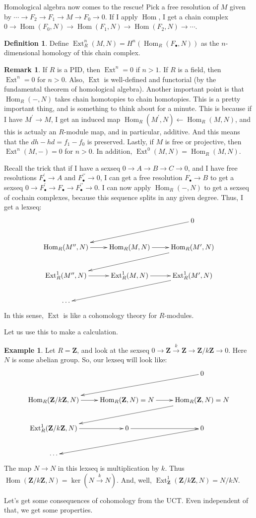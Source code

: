 \documentclass{amsart}
\theoremstyle{theorem}
\theoremstyle{definition}
\newtheorem{definition}[theorem]{Definition}
\newtheorem{remark}[theorem]{Remark}
\newtheorem{example}[theorem]{Example}
\DeclareMathOperator{\Ext}{Ext}
\DeclareMathOperator{\Hom}{Hom}
\newcommand{\Z}{\mathbf Z}
\begin{document}
Homological algebra now comes to the rescue! Pick a free resolution of $M$ given by $\cdots\to F_2\to F_1\to M\to F_0\to 0$. If I apply $\Hom$, I get a chain complex $0\to \Hom(F_0,N)\to \Hom(F_1,N)\to \Hom(F_2,N)\to\cdots$.
\begin{definition}
Define $\Ext_R^n(M,N)= H^n(\Hom_R(F_\bullet,N))$ as the $n$-dimensional homology of this chain complex.
\end{definition}
\begin{remark}
If $R$ is a PID, then $\Ext^n=0$ if $n>1$. If $R$ is a field, then $\Ext^n=0$ for $n>0$. Also, $\Ext$ is well-defined and functorial (by the fundamental theorem of homological algebra). Another important point is that $\Hom_R(-,N)$ takes chain homotopies to chain homotopies. This is a pretty important thing, and is something to think about for a minute. This is because if I have $M^\prime\to M$, I get an induced map $\Hom_R(M^\prime,N)\leftarrow\Hom_R(M,N)$, and this is actualy an $R$-module map, and in particular, additive. And this means that the $dh-hd=f_1-f_0$ is preserved. Lastly, if $M$ is free or projective, then $\Ext^n(M,-)=0$ for $n>0$. In addition, $\Ext^0(M,N)=\Hom_R(M,N)$.
\end{remark}
Recall the trick that if I have a sexseq $0\to A\to B\to C\to 0$, and I have free resolutions $F^\prime_\bullet\to A$ and $F^{\prime\prime}_\bullet\to 0$, I can get a free resolution $F_\bullet\to B$ to get a sexseq $0\to F^\prime_\bullet\to F_\bullet\to F^{\prime\prime}_\bullet\to 0$. I can now apply $\Hom_R(-,N)$ to get a sexseq of cochain complexes, because this sequence splits in any given degree. Thus, I get a lexseq:
\begin{equation*}
\xymatrix{ & & 0\ar[dll]\\
\Hom_R(M^{\prime\prime},N)\ar[r] & \Hom_R(M,N)\ar[r] & \Hom_R(M^{\prime},N)\ar[dll]\\
\Ext^1_R(M^{\prime\prime},N)\ar[r] & \Ext^1_R(M,N)\ar[r] & \Ext^1_R(M^{\prime},N)\ar[dll]\\
\cdots & &}
\end{equation*}
In this sense, $\Ext$ is like a cohomology theory for $R$-modules.

Let us use this to make a calculation.
\begin{example}
Let $R=\Z$, and look at the sexseq $0\to \Z\xrightarrow{k}\Z\to\Z/k\Z\to 0$. Here $N$ is some abelian group. So, our lexseq will look like:
\begin{equation*}
\xymatrix{ & & 0\ar[dll]\\
\Hom_R(\Z/k\Z,N)\ar[r] & \Hom_R(\Z,N)=N\ar[r] & \Hom_R(\Z,N)=N\ar[dll]\\
\Ext^1_R(\Z/k\Z,N)\ar[r] & 0\ar[r] & 0\ar[dll]\\
\cdots & &}
\end{equation*}
The map $N\to N$ in this lexseq is multiplication by $k$. Thus $\Hom(\Z/k\Z,N)=\ker(N\xrightarrow{k}N)$. And, well, $\Ext^1_\Z(\Z/k\Z,N)=N/kN$.
\end{example}
Let's get some consequences of cohomology from the UCT. Even independent of that, we get some properties.
\end{document}
